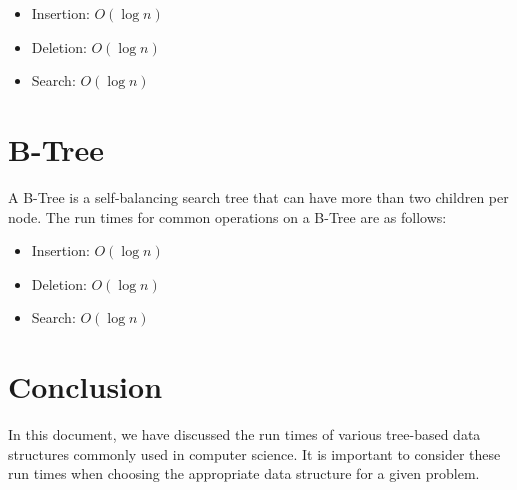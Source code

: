 \documentclass{article}
\begin{document}
\begin{itemize}
    \item Insertion: $O(\log n)$
    \item Deletion: $O(\log n)$
    \item Search: $O(\log n)$
\end{itemize}

\section{B-Tree}

A B-Tree is a self-balancing search tree that can have more than two children per node. The run times for common operations on a B-Tree are as follows:

\begin{itemize}
    \item Insertion: $O(\log n)$
    \item Deletion: $O(\log n)$
    \item Search: $O(\log n)$
\end{itemize}

\section{Conclusion}

In this document, we have discussed the run times of various tree-based data structures commonly used in computer science. It is important to consider these run times when choosing the appropriate data structure for a given problem.
\end{document}

